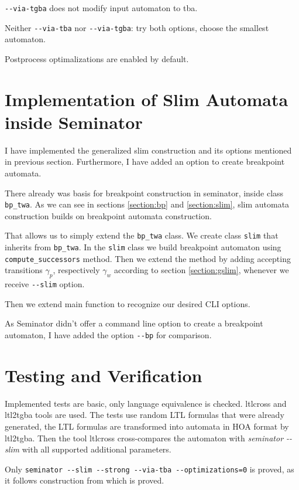 \documentclass[
	digital,
nolof, nolot
]{fithesis3}
\begin{document}
		\texttt{-{}-via-tgba} does not modify input automaton to tba.
		
		Neither \texttt{-{}-via-tba} nor \texttt{-{}-via-tgba}: try both options, choose the smallest automaton.
		
		Postprocess optimalizations are enabled by default.
		
		
	\section{Implementation of Slim Automata inside Seminator}
	I have implemented the generalized slim construction and its options mentioned in previous section. Furthermore, I have added an option to create breakpoint automata.
	
	There already was basis for breakpoint construction in seminator, inside class \texttt{bp\_twa}.
	As we can see in sections \ref{section:bp} and \ref{section:slim}, slim automata construction builds on breakpoint automata construction.
	
	That allows us to simply extend the \texttt{bp\_twa} class.
	We create class \texttt{slim} that inherits from \texttt{bp\_twa}.
	In the \texttt{slim} class we build breakpoint automaton using \texttt{compute\_successors} method.
	Then we extend the method by adding accepting transitions $\gamma_p$, respectively $\gamma_w$ according to section \ref{section:gslim}, whenever we receive \texttt{-{}-slim} option.
	
	Then we extend main function to recognize our desired CLI options.
	
	As Seminator didn't offer a command line option to create a breakpoint automaton, I have added the option \texttt{-{}-bp} for comparison.
	
	
	
	\section{Testing and Verification}
	Implemented tests are basic, only language equivalence is checked.
	ltlcross and ltl2tgba tools are used. The tests use random LTL formulas that were already generated, the LTL formulas are transformed into automata in HOA format by ltl2tgba.
	Then the tool ltlcross cross-compares the automaton with \emph{seminator -{}-slim} with all supported additional parameters.
	
	Only \texttt{seminator -{}-slim -{}-strong -{}-via-tba -{}-optimizations=0} is proved, as it follows construction from \cite{hlavni} which is proved.
	
\end{document}
